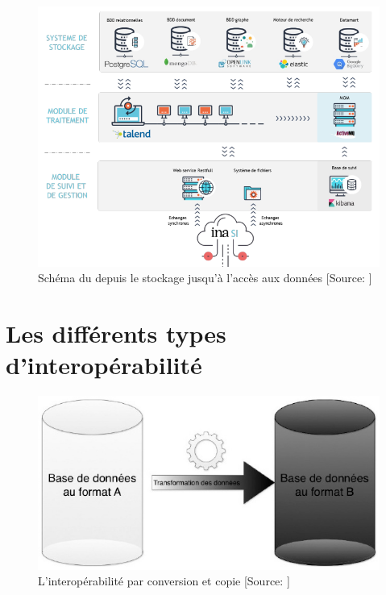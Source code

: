 \begin{figure}[!h]
	\centering
	\includegraphics[width=16cm]{images/infrastructure_unique.png}
	\caption[Schéma du \ldd depuis le stockage jusqu'à l'accès aux données]{Schéma du \ldd depuis le stockage jusqu'à l'accès aux données [Source: \cite{poupeau_rassembler_2019}]}
	\label{lac_infra}
\end{figure}

\chapter{\label{annexe_types_interop}Les différents types d'interopérabilité}

\begin{figure}[!h]
\centering
\includegraphics[width=12cm]{images/interop_conversion_copie.jpeg}
\medskip
\caption[L'interopérabilité par conversion et copie]{L'interopérabilité par conversion et copie [Source: \cite{bermes_convergence_2013}]}
\label{conversion}
\end{figure}

